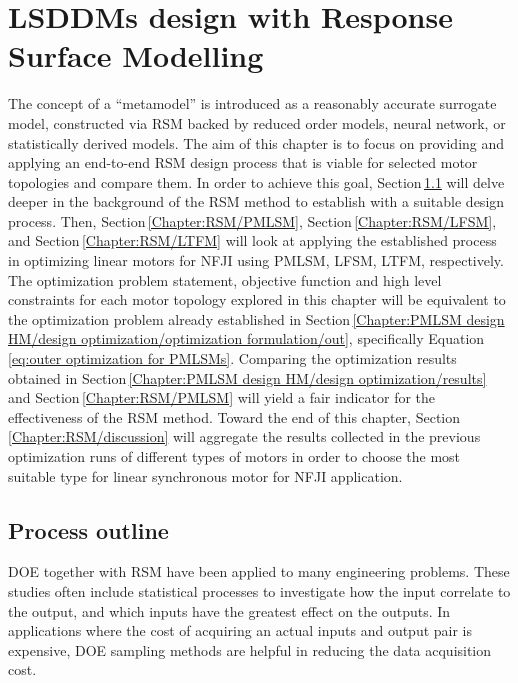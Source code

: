 \chapter{\acsp{LSDDM} design with Response Surface Modelling}   \label{Chapter:PMLSM design RSM}


    The concept of a “metamodel” is introduced as a reasonably accurate surrogate model, constructed via \acf{RSM} backed by reduced order models, neural network, or statistically derived models. The aim of this chapter is to focus on providing and applying an end-to-end \acs{RSM} design process that is viable for selected motor topologies and compare them. In order to achieve this goal, Section\,\ref{Chapter:RSM/outline} will delve deeper in the background of the \acs{RSM} method to establish with a suitable design process. Then, Section\,\ref{Chapter:RSM/PMLSM}, Section\,\ref{Chapter:RSM/LFSM}, and Section\,\ref{Chapter:RSM/LTFM} will look at applying the established process in optimizing linear motors for \acs{NFJI} using \acf{PMLSM}, \acf{LFSM}, \acf{LTFM}, respectively. The optimization problem statement, objective function and high level constraints for each motor topology explored in this chapter will be equivalent to the optimization problem already established in Section\,\ref{Chapter:PMLSM design HM/design optimization/optimization formulation/out}, specifically Equation\,\ref{eq:outer optimization for PMLSMs}. Comparing the optimization results obtained in Section\,\ref{Chapter:PMLSM design HM/design optimization/results} and Section\,\ref{Chapter:RSM/PMLSM} will yield a fair indicator for the effectiveness of the \ac{RSM} method. Toward the end of this chapter, Section\,\ref{Chapter:RSM/discussion} will aggregate the results collected in the previous optimization runs of different types of motors in order to choose the most suitable type for linear synchronous motor for \acs{NFJI} application.


    \section{Process outline}                        \label{Chapter:RSM/outline}
    
    
        \acf{DOE} together with \ac{RSM} have been applied to many engineering problems. These studies often include statistical processes to investigate how the input correlate to the output, and which inputs have the greatest effect on the outputs. In applications where the cost of acquiring an actual inputs and output pair is expensive, \ac{DOE} sampling methods are helpful in reducing the data acquisition cost. 
        
